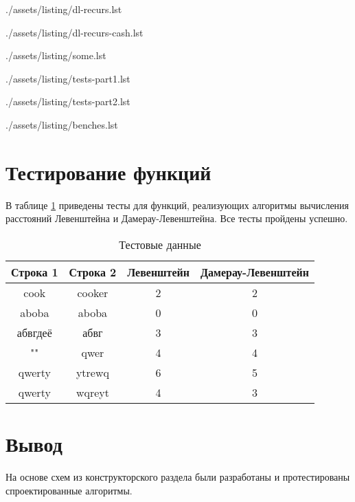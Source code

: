 \clearpage
\begin{lstinputlisting}[
	caption={Рекурсивный алгоритм Дамерау-Левенштейна},
	label={lst:dl-recurs},
	style={golang}
]{./assets/listing/dl-recurs.lst}
\end{lstinputlisting}

\clearpage
\begin{lstinputlisting}[
	caption={Рекурсивный алгоритм с кэшем Дамерау-Левенштейна},
	label={lst:dl-recurs-cash},
	style={golang}
]{./assets/listing/dl-recurs-cash.lst}
\end{lstinputlisting}

\clearpage
\begin{lstinputlisting}[
	caption={Вспомогательные функции для расчёта расстояний},
	label={lst:some},
	style={golang}
]{./assets/listing/some.lst}
\end{lstinputlisting}

\clearpage
\begin{lstinputlisting}[
	caption={Пример реализации тестов},
	label={lst:tests},
	style={golang}
]{./assets/listing/tests-part1.lst}
\end{lstinputlisting}

\clearpage
\begin{lstinputlisting}[
	caption={Пример реализации тестов},
	label={lst:tests2},
	style={golang}
]{./assets/listing/tests-part2.lst}
\end{lstinputlisting}

\clearpage
\begin{lstinputlisting}[
	caption={Пример реализации бенчмарка},
	label={lst:benches},
	style={golang}
]{./assets/listing/benches.lst}
\end{lstinputlisting}

\clearpage
\section{Тестирование функций}

В таблице \ref{tbl:test} приведены тесты для функций, реализующих алгоритмы вычисления расстояний Левенштейна и Дамерау-Левенштейна.
Все тесты пройдены успешно.

\begin{table}[h!]
	\begin{center}
		\caption{\label{tbl:test}Тестовые данные}
		\begin{tabular}{|c|c|c|c|}
			\hline
			\bfseries Строка 1 & \bfseries Строка 2 & \bfseries Левенштейн & \bfseries Дамерау-Левенштейн \\ 
			\hline
			cook & cooker & 2 & 2 \\ \hline
			aboba & aboba & 0 & 0 \\ \hline
			абвгдеё & абвг & 3 & 3 \\ \hline
			"" & qwer & 4 & 4 \\ \hline
			qwerty & ytrewq & 6 & 5 \\ \hline
			qwerty & wqreyt & 4 & 3 \\ \hline
		\end{tabular}
	\end{center}
\end{table}

\section*{Вывод}

На основе схем из конструкторского раздела были разработаны и протестированы спроектированные алгоритмы.
